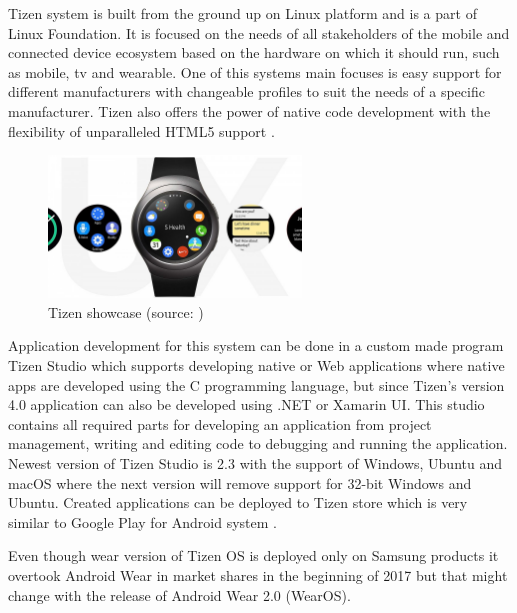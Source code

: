 Tizen system is built from the ground up on Linux platform and is a part of Linux Foundation. It is focused on the needs of all stakeholders of the mobile and connected device ecosystem based on the hardware on which it should run, such as mobile, tv and wearable. One of this systems main focuses is easy support for different manufacturers with changeable profiles to suit the needs of a specific manufacturer. Tizen also offers the power of native code development with the flexibility of unparalleled HTML5 support \cite{TizenAbout}.

\begin{figure}[H]
	\begin{centering}
		\includegraphics[width=0.6\textwidth]{img/tizen}
		\par\end{centering}
	\caption{Tizen showcase (source: \cite{NFFAWSW})\label{fig:Tizen}}
	\label{fig05c04}
\end{figure}

Application development for this system can be done in a custom made program Tizen Studio which supports developing native or Web applications where native apps are developed using the C programming language, but since Tizen's version 4.0 application can also be developed using .NET or Xamarin UI. This studio contains all required parts for developing an application from project management, writing and editing code to debugging and running the application. Newest version of Tizen Studio is 2.3 with the support of Windows, Ubuntu and macOS where the next version will remove support for 32-bit Windows and Ubuntu. Created applications can be deployed to Tizen store which is very similar to Google Play for Android system \cite{TizenDev}.

Even though wear version of Tizen OS is deployed only on Samsung products it overtook Android Wear in market shares in the beginning of 2017 but that might change with the release of Android Wear 2.0 (WearOS). 

